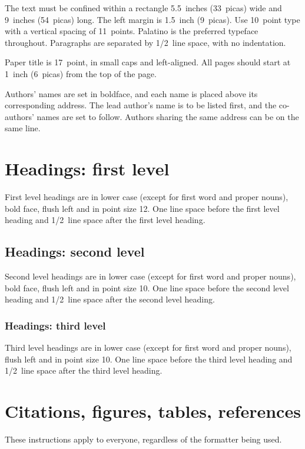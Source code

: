 \documentclass{article} %
\begin{document}
The text must be confined within a rectangle 5.5~inches (33~picas) wide and
9~inches (54~picas) long. The left margin is 1.5~inch (9~picas).
Use 10~point type with a vertical spacing of 11~points. Palatino is the
preferred typeface throughout. Paragraphs are separated by 1/2~line space,
with no indentation.

Paper title is 17~point, in small caps and left-aligned.
All pages should start at 1~inch (6~picas) from the top of the page.

Authors' names are
set in boldface, and each name is placed above its corresponding
address. The lead author's name is to be listed first, and
the co-authors' names are set to follow. Authors sharing the
same address can be on the same line.

\section{Headings: first level}
\label{headings}

First level headings are in lower case (except for first word and proper nouns), bold face,
flush left and in point size 12. One line space before the first level
heading and 1/2~line space after the first level heading.

\subsection{Headings: second level}

Second level headings are in lower case (except for first word and proper nouns), bold face,
flush left and in point size 10. One line space before the second level
heading and 1/2~line space after the second level heading.

\subsubsection{Headings: third level}

Third level headings are in lower case (except for first word and proper nouns),
flush left and in point size 10. One line space before the third level
heading and 1/2~line space after the third level heading.

\section{Citations, figures, tables, references}
\label{others}

These instructions apply to everyone, regardless of the formatter being used.
\end{document}

